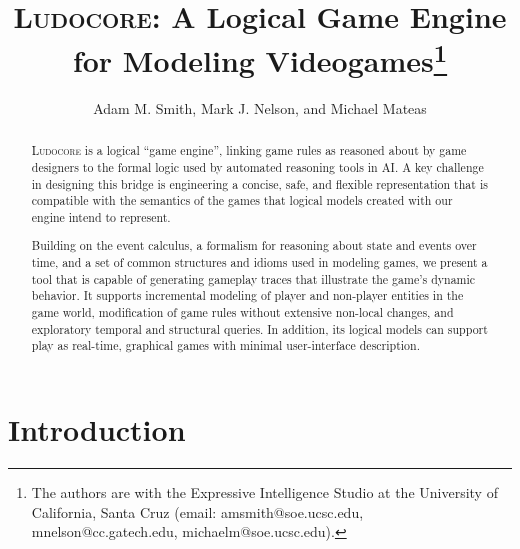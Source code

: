 \documentclass[conference]{IEEEtran}
\newcommand{\Ludocore}{\textsc{Ludocore}}
\begin{document}
\title{\ \\ \LARGE\bf\textsc{Ludocore}: A Logical Game Engine for Modeling
Videogames\thanks{The authors are with the Expressive Intelligence Studio at
the University of California, Santa Cruz (email: amsmith@soe.ucsc.edu,
\mbox{mnelson@cc.gatech.edu}, michaelm@soe.ucsc.edu).}}

\author{Adam M. Smith, Mark J. Nelson, and Michael Mateas}

\maketitle
\begin{abstract}

\Ludocore{} is a logical ``game engine'', linking game rules as reasoned about by
game designers to the formal logic used by automated reasoning tools in AI.
A key challenge in designing this bridge is engineering a concise, safe, and
flexible representation that is compatible with the semantics of the games that
logical models created with our engine intend to represent.

Building on the event calculus, a formalism for reasoning about state and
events over time, and a set of common structures and idioms used in
modeling games, we present a tool that is capable of generating gameplay traces
that illustrate the game's dynamic behavior. It supports incremental modeling
of player and non-player entities in the game world, modification of game
rules without extensive non-local changes, and exploratory temporal and
structural queries. In addition, its logical models can support play as
real-time, graphical games with minimal user-interface description.

\end{abstract}

\section{Introduction}
\end{document}
